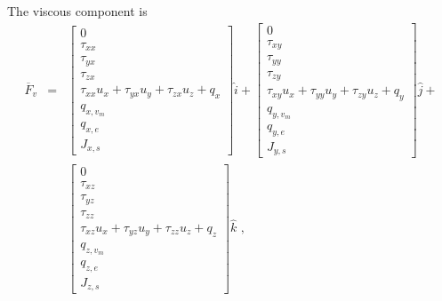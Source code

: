 The viscous component is
\begin{eqnarray}
 \overline{F}_{v} & = & \left [ 
                            \begin{array}{c} 
                                0 \\
                                \tau_{xx} \\
                                \tau_{yx} \\
                                \tau_{zx} \\
                                \tau_{xx} u_{x} + \tau_{yx} u_{y} + \tau_{zx} u_{z} + q_{x} \\
                                q_{x,v_{m}} \\
                                q_{x,e} \\
                                J_{x,s}
                            \end{array}
                          \right ] \hat{i} 
                        + \left [ 
                             \begin{array}{c}
                                 0 \\
                                 \tau_{xy} \\
                                 \tau_{yy} \\
                                 \tau_{zy} \\
                                 \tau_{xy} u_{x} + \tau_{yy} u_{y} + \tau_{zy} u_{z} + q_{y} \\
                                 q_{y,v_{m}} \\
                                 q_{y,e} \\
                                 J_{y,s}
                             \end{array}
                          \right ] \hat{j}  + \nonumber \\
                  &   &   \left [
                             \begin{array}{c}
                                 0 \\
                                 \tau_{xz} \\
                                 \tau_{yz} \\
                                 \tau_{zz} \\
                                 \tau_{xz} u_{x} + \tau_{yz} u_{y} + \tau_{zz} u_{z} + q_{z} \\
                                 q_{z,v_{m}} \\
                                 q_{z,e} \\
                                 J_{z,s}
                             \end{array}
                          \right ] \hat{k} \text{ , }
 \label{eq:F_v_3D}
\end{eqnarray}
